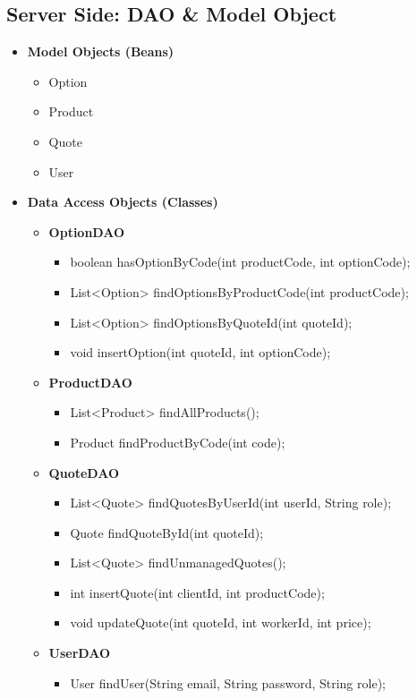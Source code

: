 \documentclass[a4paper, 12pt]{article}
\begin{document}
\subsection{Server Side: DAO \& Model Object}
\begin{itemize}
	\item \textbf{Model Objects (Beans)}
	\begin{itemize}
		\item Option
		\item Product
		\item Quote
		\item User
	\end{itemize}
	\item \textbf{Data Access Objects (Classes)}
	\begin{itemize}
		\item \textbf{OptionDAO}
		\begin{itemize}
			\item boolean hasOptionByCode(int productCode, int optionCode);
			\item List<Option> findOptionsByProductCode(int productCode);
			\item List<Option> findOptionsByQuoteId(int quoteId);
			\item void insertOption(int quoteId, int optionCode);
		\end{itemize}
		\item \textbf{ProductDAO}
		\begin{itemize}
			\item List<Product> findAllProducts();
			\item Product findProductByCode(int code);
		\end{itemize}
		\item \textbf{QuoteDAO}
		\begin{itemize}
			\item List<Quote> findQuotesByUserId(int userId, String role);
			\item Quote findQuoteById(int quoteId);
			\item List<Quote> findUnmanagedQuotes();
			\item int insertQuote(int clientId, int productCode);
			\item void updateQuote(int quoteId, int workerId, int price);
		\end{itemize}
		\item \textbf{UserDAO}
		\begin{itemize}
			\item User findUser(String email, String password, String role);

\end{itemize}
\end{itemize}
\end{itemize}
\end{document}
